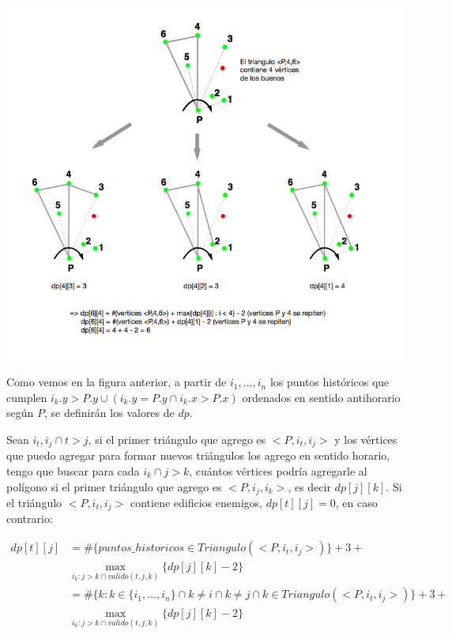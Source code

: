 \centerline{\includegraphics[scale=0.7]{img/ej35.png}}

Como vemos en la figura anterior, a partir de $i_1,...,i_n$ los puntos históricos que cumplen
$i_k.y > P.y \cup (i_k.y = P.y \cap i_k.x > P.x)$ ordenados en sentido antihorario según $P$, se definirán los
valores de $dp$. 

Sean $i_t, i_j \cap t > j$, si el primer triángulo que agrego es $<P,i_t,i_j>$ y los vértices que puedo agregar
para formar nuevos triángulos los agrego en sentido horario, tengo que buscar para cada $i_k \cap j > k$, cuántos
vértices podría agregarle al polígono si el primer triángulo que agrego es $<P,i_j,i_k>$, es decir $dp[j][k]$.
Si el triángulo $<P,i_t,i_j>$ contiene edificios enemigos, $dp[t][j] = 0$, en caso contrario:

\begin{equation*}
\begin{split}
    dp[t][j] & = \#\{ puntos\_historicos \in Triangulo(<P,i_t,i_j>)\} + 3 + \\
    & \max_{ i_k : j > k \cap valido(t,j,k) } \{dp[j][k]-2\} \\
    & = \#\{ k : k \in \{i_1,...,i_n\} \cap k \neq i \cap k \neq j \cap k \in Triangulo(<P,i_t,i_j>)\} + 3 + \\
    & \max_{ i_k : j > k \cap valido(t,j,k) } \{dp[j][k]-2\}
\end{split}
\end{equation*}

